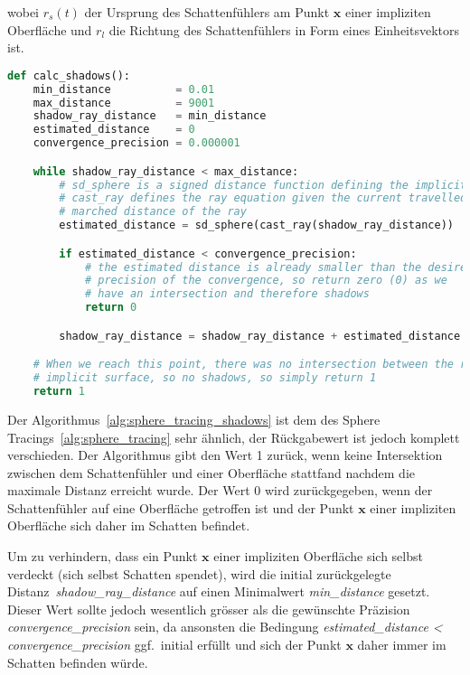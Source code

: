 wobei $r_{s}(t)$ der Ursprung des Schattenfühlers am Punkt $\bm{x}$
einer impliziten Oberfläche und $r_{l}$ die Richtung des
Schattenfühlers in Form eines Einheitsvektors ist.

\begin{lstlisting}[language=Python,caption={Algorithmus zur Berechnung
        von Schatten.},label={alg:sphere_tracing_shadows},captionpos=b,emph={calc_shadows}]
def calc_shadows():
    min_distance          = 0.01
    max_distance          = 9001
    shadow_ray_distance   = min_distance
    estimated_distance    = 0
    convergence_precision = 0.000001

    while shadow_ray_distance < max_distance:
        # sd_sphere is a signed distance function defining the implicit surface
        # cast_ray defines the ray equation given the current travelled /
        # marched distance of the ray
        estimated_distance = sd_sphere(cast_ray(shadow_ray_distance))

        if estimated_distance < convergence_precision:
            # the estimated distance is already smaller than the desired
            # precision of the convergence, so return zero (0) as we
            # have an intersection and therefore shadows
            return 0

        shadow_ray_distance = shadow_ray_distance + estimated_distance

    # When we reach this point, there was no intersection between the ray and a
    # implicit surface, so no shadows, so simply return 1
    return 1
\end{lstlisting}

Der Algorithmus~\ref{alg:sphere_tracing_shadows} ist dem des Sphere
Tracings~\ref{alg:sphere_tracing} sehr ähnlich, der Rückgabewert ist
jedoch komplett verschieden. Der Algorithmus gibt den Wert 1 zurück,
wenn keine Intersektion zwischen dem  Schattenfühler und einer
Oberfläche stattfand nachdem die maximale Distanz erreicht wurde. Der
Wert 0 wird zurückgegeben, wenn der Schattenfühler auf eine Oberfläche
getroffen ist und der Punkt $\bm{x}$ einer impliziten Oberfläche sich
daher im Schatten befindet.

Um zu verhindern, dass ein Punkt $\bm{x}$ einer impliziten Oberfläche
sich selbst verdeckt (sich selbst Schatten spendet), wird die initial
zurückgelegte Distanz~\textit{shadow\_ray\_distance} auf einen Minimalwert
\textit{min\_distance} gesetzt. Dieser Wert sollte jedoch wesentlich
grösser als die gewünschte Präzision \textit{convergence\_precision}
sein, da ansonsten die Bedingung \textit{estimated\_distance <
    convergence\_precision} ggf.\ initial erfüllt und sich der Punkt $\bm{x}$
daher immer im Schatten befinden würde.

